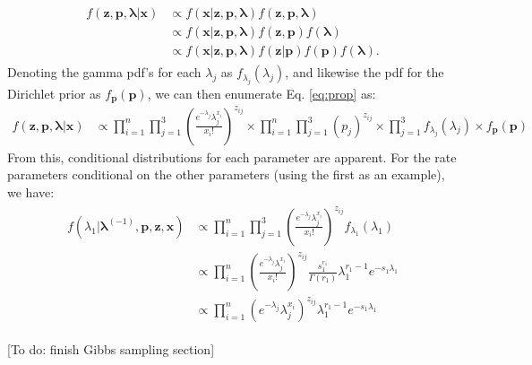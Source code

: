 \begin{DoubleSpace*}
\begin{align}
\label{eq:prop}
\begin{split}
f(\textbf{z},\textbf{p},\boldsymbol{\lambda}|\textbf{x}) &\propto f(\textbf{x}|\textbf{z},\textbf{p},\boldsymbol{\lambda}) f(\textbf{z},\textbf{p},\boldsymbol{\lambda}) \\
&\propto f(\textbf{x}|\textbf{z},\textbf{p},\boldsymbol{\lambda})f(\textbf{z},\textbf{p}) f(\boldsymbol{\lambda}) \\
&\propto f(\textbf{x}|\textbf{z},\textbf{p},\boldsymbol{\lambda})f(\textbf{z}|\textbf{p}) f(\textbf{p}) f(\boldsymbol{\lambda}).
\end{split}
\end{align}
Denoting the gamma pdf's for each $\lambda_j$ as $f_{\lambda_j}(\lambda_j)$, and likewise the pdf for the Dirichlet prior as $f_{\textbf{p}}(\textbf{p})$, we can then enumerate Eq. \ref{eq:prop} as:
\begin{align}
	f(\textbf{z},\textbf{p},\boldsymbol{\lambda}|\textbf{x}) &\propto \prod_{i=1}^{n} \prod_{j=1}^3 \left(\frac{e^{-\lambda_j}\lambda_j^{x_i}}{x_i!}\right)^{z_{ij}} \times \prod_{i=1}^{n} \prod_{j=1}^3 (p_j)^{z_{ij}} \times \prod_{j=1}^3 f_{\lambda_j}(\lambda_j) \times f_{\textbf{p}}(\textbf{p})
\end{align}
From this, conditional distributions for each parameter are apparent. For the rate parameters conditional on the other parameters (using the first as an example), we have:
\begin{align}
\begin{split}
	f(\lambda_1|\boldsymbol{\lambda}^{(-1)},\textbf{p},\textbf{z},\textbf{x})&\propto \prod_{i=1}^{n} \prod_{j=1}^3 \left(\frac{e^{-\lambda_j}\lambda_j^{x_i}}{x_i!}\right)^{z_{ij}} f_{\lambda_1}(\lambda_1) \\
	&\propto \prod_{i=1}^{n} \left(\frac{e^{-\lambda_j}\lambda_j^{x_i}}{x_i!}\right)^{z_{ij}} \frac{s_1^{r_1}}{\Gamma(r_1)} \lambda_1^{r_1-1} e^{-s_1 \lambda_1}\\
	&\propto \prod_{i=1}^{n} \left( e^{-\lambda_j}\lambda_j^{x_i} \right)^{z_{ij}}  \lambda_1^{r_1-1} e^{-s_1 \lambda_1}
\end{split}
\end{align}

[To do: finish Gibbs sampling section]

\end{DoubleSpace*}